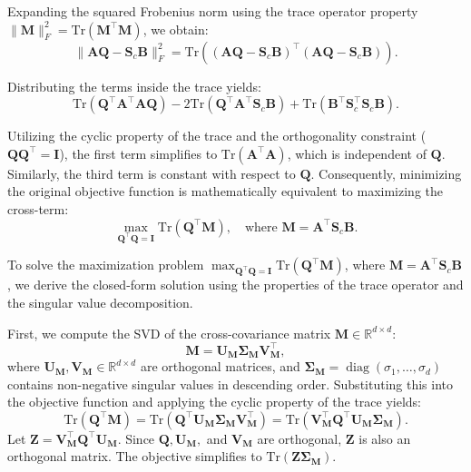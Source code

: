 Expanding the squared Frobenius norm using the trace operator property $\| \mathbf{M} \|_F^2 = \text{Tr}(\mathbf{M}^\top \mathbf{M})$, we obtain:
\begin{equation}
    \| \mathbf{A} \mathbf{Q} - \mathbf{S}_c \mathbf{B} \|_F^2 = \text{Tr}\left( (\mathbf{A} \mathbf{Q} - \mathbf{S}_c \mathbf{B})^\top (\mathbf{A} \mathbf{Q} - \mathbf{S}_c \mathbf{B}) \right).
\end{equation}

Distributing the terms inside the trace yields:
\begin{equation}
    \text{Tr}(\mathbf{Q}^\top \mathbf{A}^\top \mathbf{A} \mathbf{Q}) - 2\text{Tr}(\mathbf{Q}^\top \mathbf{A}^\top \mathbf{S}_c \mathbf{B}) + \text{Tr}(\mathbf{B}^\top \mathbf{S}_c^\top \mathbf{S}_c \mathbf{B}).
\end{equation}

Utilizing the cyclic property of the trace and the orthogonality constraint ($\mathbf{Q}\mathbf{Q}^\top = \mathbf{I}$), the first term simplifies to $\text{Tr}(\mathbf{A}^\top \mathbf{A})$, which is independent of $\mathbf{Q}$. Similarly, the third term is constant with respect to $\mathbf{Q}$. Consequently, minimizing the original objective function is mathematically equivalent to maximizing the cross-term:
\begin{equation}
    \max_{\mathbf{Q}^\top \mathbf{Q} = \mathbf{I}} \text{Tr}(\mathbf{Q}^\top \mathbf{M}), \quad \text{where } \mathbf{M} = \mathbf{A}^\top \mathbf{S}_c \mathbf{B}.
\end{equation}

To solve the maximization problem $\max_{\mathbf{Q}^\top \mathbf{Q} = \mathbf{I}} \text{Tr}(\mathbf{Q}^\top \mathbf{M})$, where $\mathbf{M} = \mathbf{A}^\top \mathbf{S}_c \mathbf{B}$, we derive the closed-form solution using the properties of the trace operator and the singular value decomposition.

First, we compute the SVD of the cross-covariance matrix $\mathbf{M} \in \mathbb{R}^{d \times d}$:
\begin{equation}
    \mathbf{M} = \mathbf{U}_{\mathbf{M}} \mathbf{\Sigma}_{\mathbf{M}} \mathbf{V}_{\mathbf{M}}^\top,
\end{equation}
where $\mathbf{U}_{\mathbf{M}}, \mathbf{V}_{\mathbf{M}} \in \mathbb{R}^{d \times d}$ are orthogonal matrices, and $\mathbf{\Sigma}_{\mathbf{M}} = \operatorname{diag}(\sigma_1, \ldots, \sigma_d)$ contains non-negative singular values in descending order. Substituting this into the objective function and applying the cyclic property of the trace yields:
\begin{equation}
    \text{Tr}(\mathbf{Q}^\top \mathbf{M}) = \text{Tr}(\mathbf{Q}^\top \mathbf{U}_{\mathbf{M}} \mathbf{\Sigma}_{\mathbf{M}} \mathbf{V}_{\mathbf{M}}^\top) = \text{Tr}(\mathbf{V}_{\mathbf{M}}^\top \mathbf{Q}^\top \mathbf{U}_{\mathbf{M}} \mathbf{\Sigma}_{\mathbf{M}}).
\end{equation}
Let $\mathbf{Z} = \mathbf{V}_{\mathbf{M}}^\top \mathbf{Q}^\top \mathbf{U}_{\mathbf{M}}$. Since $\mathbf{Q}, \mathbf{U}_{\mathbf{M}},$ and $\mathbf{V}_{\mathbf{M}}$ are orthogonal, $\mathbf{Z}$ is also an orthogonal matrix. The objective simplifies to $\text{Tr}(\mathbf{Z} \mathbf{\Sigma}_{\mathbf{M}})$.

